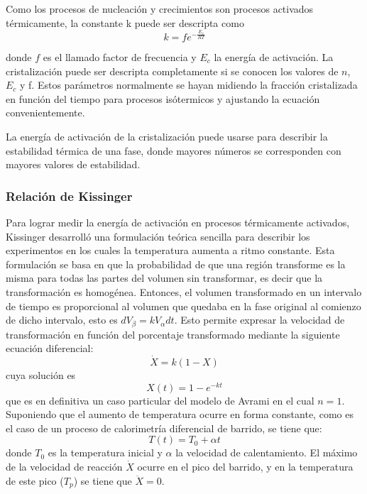 \documentclass[12pt]{article}
\theoremstyle{definition}
\theoremstyle{remark}
\begin{document}
Como los procesos de nucleación y crecimientos son procesos activados térmicamente, la constante k puede ser descripta como
\begin{equation}
\label{kvalue}
	k=fe^{-\frac{E_c}{RT}}
\end{equation}

donde $f$ es el llamado factor de frecuencia y $E_c$ la energía de activación.
La cristalización puede ser descripta completamente si se conocen los valores de $n$, $E_c$ y f. Estos parámetros normalmente se hayan midiendo la fracción cristalizada en función del tiempo para procesos isótermicos y ajustando la ecuación convenientemente.

La energía de activación de la cristalización puede usarse para describir la estabilidad térmica de una fase, donde mayores números se corresponden con mayores valores de estabilidad.

\subsubsection{Relación de Kissinger}
Para lograr medir la energía de activación en procesos térmicamente activados, Kissinger desarrolló una formulación teórica sencilla para describir los experimentos en los cuales la temperatura aumenta a ritmo constante. Esta formulación se basa en que la probabilidad de que una región transforme es la misma para todas las partes del volumen sin transformar, es decir que la transformación es homogénea. Entonces, el volumen transformado en un intervalo de tiempo es proporcional al volumen que quedaba en la fase original al comienzo de dicho intervalo, esto es $dV_\beta = k V_\alpha dt$. Esto permite expresar la velocidad de transformación en función del porcentaje transformado mediante la siguiente ecuación diferencial:
\begin{equation}
	\dot{X} = k(1-X)
\end{equation}
cuya solución es
\begin{equation}
	X(t) = 1 - e^{-kt}
\end{equation}
que es en definitiva un caso particular del modelo de Avrami en el cual $n=1$.
Suponiendo que el aumento de temperatura ocurre en forma constante, como es el caso de un proceso de calorimetría diferencial de barrido, se tiene que:
\begin{equation}
	T(t) = T_0+\alpha t
\end{equation}
donde $T_0$ es la temperatura inicial y $\alpha$ la velocidad de calentamiento. El máximo de la velocidad de reacción $\dot{X}$ ocurre en el pico del barrido, y en la temperatura de este pico ($T_p$) se tiene que $\ddot{X} = 0$.
\end{document}
